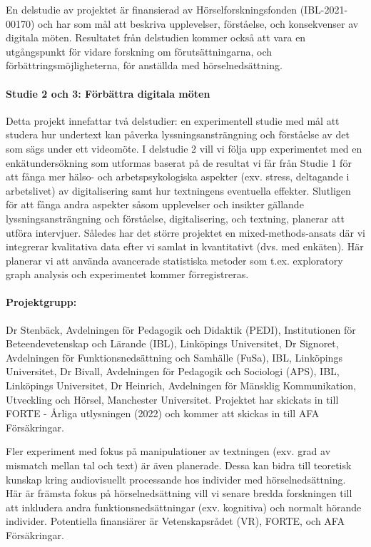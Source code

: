 \documentclass[]{article}
\begin{document}
En delstudie av projektet är finansierad av Hörselforskningsfonden
(IBL-2021-00170) och har som mål att beskriva upplevelser, förståelse,
och konsekvenser av digitala möten. Resultatet från delstudien kommer
också att vara en utgångspunkt för vidare forskning om
förutsättningarna, och förbättringsmöjligheterna, för anställda med
hörselnedsättning.

\hypertarget{studie-2-och-3-fuxf6rbuxe4ttra-digitala-muxf6ten}{%
\paragraph{Studie 2 och 3: Förbättra digitala
möten}\label{studie-2-och-3-fuxf6rbuxe4ttra-digitala-muxf6ten}}

Detta projekt innefattar två delstudier: en experimentell studie med mål
att studera hur undertext kan påverka lyssningsansträngning och
förståelse av det som sägs under ett videomöte. I delstudie 2 vill vi
följa upp experimentet med en enkätundersökning som utformas baserat på
de resultat vi får från Studie 1 för att fånga mer hälso- och
arbetspsykologiska aspekter (exv. stress, deltagande i arbetslivet) av
digitalisering samt hur textningens eventuella effekter. Slutligen för
att fånga andra aspekter såsom upplevelser och insikter gällande
lyssningsansträngning och förståelse, digitalisering, och textning,
planerar att utföra intervjuer. Således har det större projektet en
mixed-methods-ansats där vi integrerar kvalitativa data efter vi samlat
in kvantitativt (dvs. med enkäten). Här planerar vi att använda
avancerade statistiska metoder som t.ex. exploratory graph analysis och
experimentet kommer förregistreras.

\hypertarget{projektgrupp}{%
\paragraph{Projektgrupp:}\label{projektgrupp}}

Dr Stenbäck, Avdelningen för Pedagogik och Didaktik (PEDI),
Institutionen för Beteendevetenskap och Lärande (IBL), Linköpings
Universitet, Dr Signoret, Avdelningen för Funktionsnedsättning och
Samhälle (FuSa), IBL, Linköpings Universitet, Dr Bivall, Avdelningen för
Pedagogik och Sociologi (APS), IBL, Linköpings Universitet, Dr Heinrich,
Avdelningen för Mänsklig Kommunikation, Utveckling och Hörsel,
Manchester Universitet. Projektet har skickats in till FORTE - Årliga
utlysningen (2022) och kommer att skickas in till AFA Försäkringar.

Fler experiment med fokus på manipulationer av textningen (exv. grad av
mismatch mellan tal och text) är även planerade. Dessa kan bidra till
teoretisk kunskap kring audiovisuellt processande hos individer med
hörselnedsättning. Här är främsta fokus på hörselnedsättning vill vi
senare bredda forskningen till att inkludera andra
funktionsnedsättningar (exv. kognitiva) och normalt hörande individer.
Potentiella finansiärer är Vetenskapsrådet (VR), FORTE, och AFA
Försäkringar.
\end{document}
